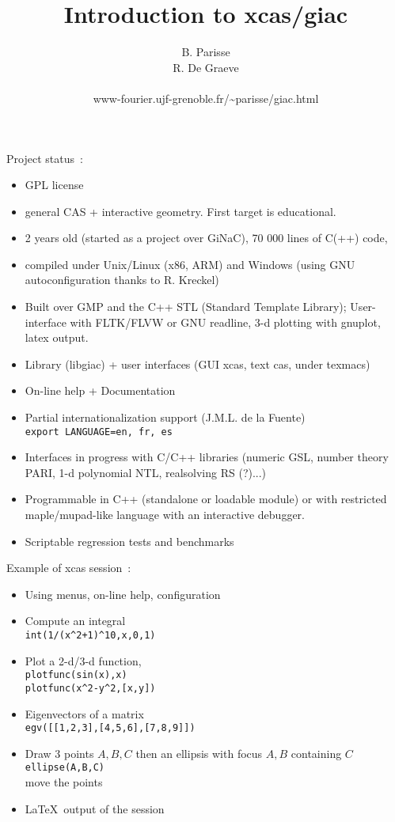 \documentclass{slides}
\begin{document}
\title{Introduction to xcas/giac}
\author{B. Parisse \\ R. De Graeve \\ \ \\ 
\small www-fourier.ujf-grenoble.fr/\~{ }parisse/giac.html}
\maketitle

\pagebreak

Project status~:
\begin{itemize}
\item GPL license
\item general CAS + interactive geometry. First target is educational.
\item 2 years old (started as a project over GiNaC), 70 000 lines of C(++) 
code, 
\item compiled under Unix/Linux (x86, ARM) and Windows (using GNU
autoconfiguration thanks to R. Kreckel)
\item Built over GMP and the C++ STL (Standard Template Library);
User-interface with FLTK/FLVW or GNU readline, 3-d plotting with gnuplot, 
latex output.
\item Library (libgiac) + user interfaces (GUI xcas, text cas, under texmacs)
\item On-line help + Documentation
\item Partial internationalization support (J.M.L. de la Fuente)\\
\verb|export LANGUAGE=en, fr, es|
\item Interfaces in progress with C/C++ libraries (numeric GSL, 
number theory PARI, 1-d polynomial NTL, realsolving RS (?)...)
\item Programmable in C++ (standalone or loadable module) or with restricted
maple/mupad-like language with an interactive debugger.
\item Scriptable regression tests and benchmarks
\end{itemize}

\pagebreak

Example of xcas session~:
\begin{itemize}
\item Using menus, on-line help, configuration
\item Compute an integral \\
\verb|int(1/(x^2+1)^10,x,0,1)|
\item Plot a 2-d/3-d function, \\
\verb|plotfunc(sin(x),x)|\\
\verb|plotfunc(x^2-y^2,[x,y])|
\item Eigenvectors of a matrix\\
\verb|egv([[1,2,3],[4,5,6],[7,8,9]])|
\item Draw 3 points $A,B,C$ then an ellipsis with focus
$A,B$ containing $C$\\
\verb|ellipse(A,B,C)|\\
move the points 
\item \LaTeX\ output of the session
\end{itemize}
\end{document}
